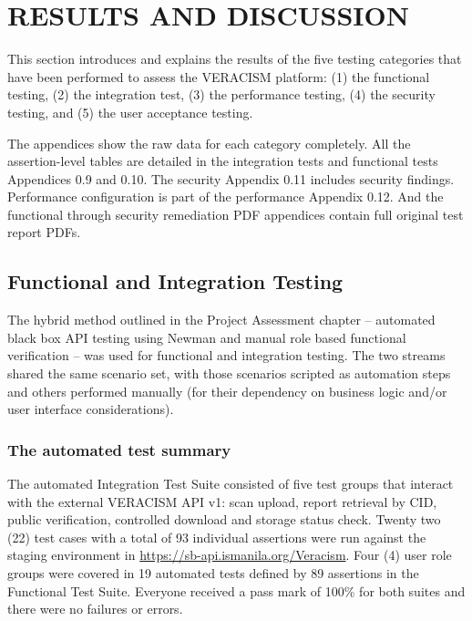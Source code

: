 
\section{RESULTS AND DISCUSSION}

This section introduces and explains the results of the five testing categories
that have been performed to assess the VERACISM platform: (1) the functional testing,
(2) the integration test, (3) the performance testing, (4) the security testing, and (5) the user acceptance testing.

The appendices show the raw data for each category completely. All the
assertion-level tables are detailed in the integration tests and functional tests
Appendices 0.9 and 0.10. The security Appendix 0.11 includes security findings. Performance configuration is part of the performance Appendix 0.12. And the functional through security remediation PDF appendices contain full original test report PDFs.

\subsection{Functional and Integration Testing}

The hybrid method outlined in the Project Assessment chapter – automated black box API testing using Newman and manual role based functional verification – was used for functional and integration testing. The two streams shared the same scenario set, with those scenarios scripted as automation steps and others performed manually (for their dependency on business logic and/or user interface considerations).

\subsubsection{The automated test summary}

The automated Integration Test Suite consisted of five test groups that interact with the external VERACISM API v1: scan upload, report retrieval by CID, public verification, controlled download and storage status check. Twenty two (22) test cases with a total of 93 individual assertions were run against the staging environment in \url{https://sb-api.ismanila.org/Veracism}. Four (4) user role groups were covered in 19 automated tests defined by 89 assertions in the Functional Test Suite. Everyone received a pass mark of 100\% for both suites and there were no failures or errors.

